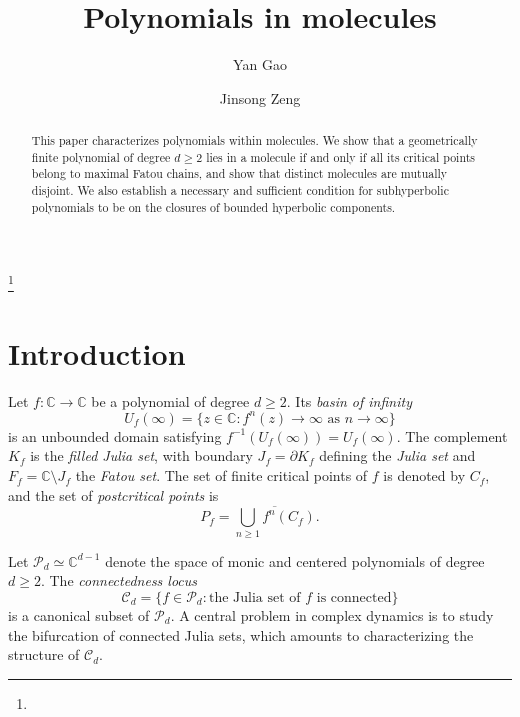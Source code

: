 \documentclass[a4paper,reqno,times, 11pt]{amsart}
\title{Polynomials in  molecules}
\author{Yan Gao}
\author{Jinsong Zeng}
\theoremstyle{remark}
\theoremstyle{plain}
\numberwithin{equation}{section}
\def\CCCC{\mathscr C}
\def\PPPP{\mathscr P}
\def\C{\mbox{$\mathbb C$}}
\def\Z{\mbox{$\mathbb Z$}}
\begin{document}
	
	
	
	\begin{abstract}
		This paper characterizes polynomials within molecules. We show that a geometrically finite polynomial of degree
		$d\geq2$ lies in a molecule if and only if all its critical points belong to maximal Fatou chains, and show that distinct molecules are mutually disjoint. We also establish a necessary and sufficient condition for subhyperbolic polynomials to be on the closures of bounded hyperbolic components.
	\end{abstract}
	
	\keywords{}
	\thanks{
	}
	
	\maketitle
	
	
	\section{Introduction}
	
	
	Let $f: \mathbb{C} \to \mathbb{C}$ be a polynomial of degree $d \geq 2$. Its \emph{basin of infinity}
	\[
	U_f(\infty) = \{z \in \mathbb{C} : f^n(z) \to \infty \text{ as } n \to \infty\}
	\]
	is an unbounded domain satisfying $f^{-1}(U_f(\infty)) = U_f(\infty)$. The complement $K_f$ is the \emph{filled Julia set}, with boundary $J_f = \partial K_f$ defining the \emph{Julia set} and $ F_f=\mathbb{C} \setminus J_f$ the \emph{Fatou set}. The set of finite critical points of $f$ is denoted by $C_f$, and the set of \emph{postcritical points} is
	\[
	P_f = \overline{\bigcup_{n \geq 1} f^n(C_f)}.
	\]
	
	
	
	Let $\PPPP_d\simeq \C^{d-1}$ denote the space of monic and centered polynomials of degree $d\geq 2$.  The \emph{connectedness locus}
	\[\CCCC_d=\{f\in\PPPP_d: \text{the Julia set of $f$ is connected}\}\]
	is a canonical  subset of $\PPPP_d$. A central problem in complex dynamics is to study the bifurcation of connected Julia sets, which amounts to
	characterizing the structure of $\CCCC_d$.
	
\end{document}
